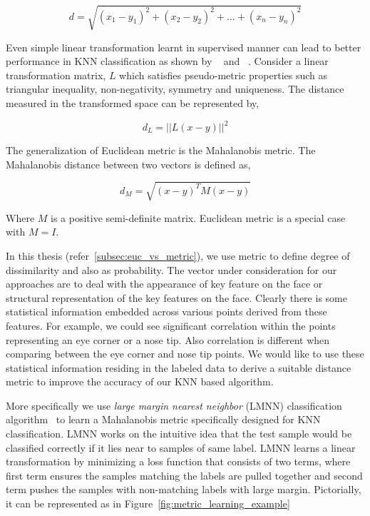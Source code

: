 \begin{equation}
    d = \sqrt{(x_1-y_1)^2 + (x_2-y_2)^2 + . . . + (x_n-y_n)^2} 
\end{equation}

Even simple linear transformation learnt in supervised manner can lead to better performance in KNN 
classification as shown by ~\cite{Shalev-Shwartz:2004:OBL:1015330.1015376} and ~\cite{NIPS2004_2566}.
Consider a linear transformation matrix, $L$ which satisfies pseudo-metric properties such as triangular 
inequality, non-negativity, symmetry and uniqueness. The distance measured in the transformed space 
can be represented by,

\begin{equation}
    d_L = || L(x - y) ||^2
\end{equation}

The generalization of Euclidean metric is the Mahalanobis metric. The Mahalanobis distance between two
vectors is defined as,

\begin{equation}
    d_M = \sqrt{ (x-y)^T M (x-y) }
\end{equation}

\noindent
Where $M$ is a positive semi-definite matrix. Euclidean metric is a special case with $M = I$.

In this thesis (refer~\ref{subsec:euc_vs_metric}), we use metric to define degree of dissimilarity and also as probability. 
The vector under consideration for our approaches are to deal with the appearance of key feature on
the face or structural representation of the key features on the face. Clearly there is some
statistical information embedded across various points derived from these features. For example,
we could see significant correlation within the points representing an eye corner or a nose tip.
Also correlation is different when comparing between the eye corner and nose tip points. We
would like to use these statistical information residing in the labeled data to derive a 
suitable distance metric to improve the accuracy of our KNN based algorithm.

More specifically we use \textit{large margin nearest neighbor} (LMNN) classification algorithm~\cite{weinberger09distance}
to learn a Mahalanobis metric specifically designed for KNN classification. LMNN works on the 
intuitive idea that the test sample would be classified correctly if it lies near to samples of
same label. LMNN learns a linear transformation by minimizing a loss function that consists of 
two terms, where first term ensures the samples matching the labels are pulled together and 
second term pushes the samples with non-matching labels with large margin. Pictorially, it can
be represented as in Figure~\ref{fig:metric_learning_example}

% 
